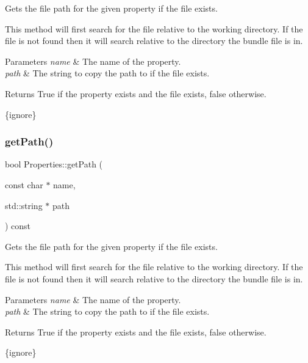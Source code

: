 Gets the file path for the given property if the file exists.

This method will first search for the file relative to the working directory. If the file is not found then it will search relative to the directory the bundle file is in.


\begin{DoxyParams}{Parameters}
{\em name} & The name of the property. \\
\hline
{\em path} & The string to copy the path to if the file exists.\\
\hline
\end{DoxyParams}
\begin{DoxyReturn}{Returns}
True if the property exists and the file exists, false otherwise.
\end{DoxyReturn}
\{ignore\} \mbox{\label{classProperties_a721bf4ef8c0669161a29068ab79fda90}} 
\subsubsection{\texorpdfstring{get\+Path()}{getPath()}\hspace{0.1cm}{\footnotesize\ttfamily [2/2]}}
{\footnotesize\ttfamily bool Properties\+::get\+Path (\begin{DoxyParamCaption}\item[{const char $\ast$}]{name,  }\item[{std\+::string $\ast$}]{path }\end{DoxyParamCaption}) const}

Gets the file path for the given property if the file exists.

This method will first search for the file relative to the working directory. If the file is not found then it will search relative to the directory the bundle file is in.


\begin{DoxyParams}{Parameters}
{\em name} & The name of the property. \\
\hline
{\em path} & The string to copy the path to if the file exists.\\
\hline
\end{DoxyParams}
\begin{DoxyReturn}{Returns}
True if the property exists and the file exists, false otherwise.
\end{DoxyReturn}
\{ignore\} \mbox{\label{classProperties_a609e433cb5798c88b2f87ef036ed3a73}} 
